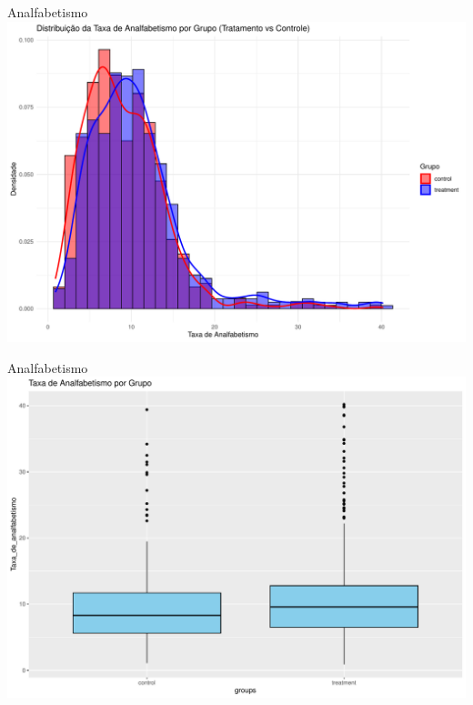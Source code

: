 \documentclass[
  ignorenonframetext,
]{beamer}
\begin{document}
\begin{frame}{Analfabetismo}
\label{analfabetismo}
\includegraphics{graficos_files/figure-beamer/unnamed-chunk-9-1.pdf}
\end{frame}

\begin{frame}{Analfabetismo}
\label{analfabetismo-1}
\includegraphics{graficos_files/figure-beamer/unnamed-chunk-10-1.pdf}
\end{frame}
\end{document}
